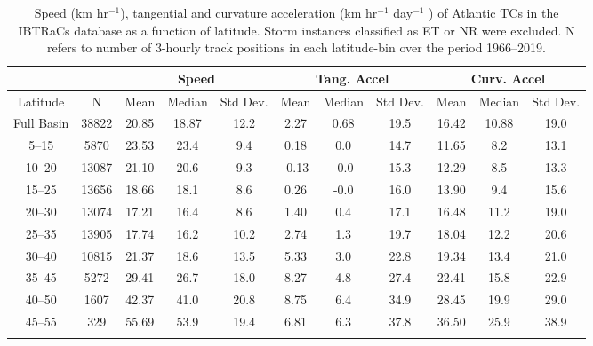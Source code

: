 \documentclass[wcd,manuscript]{copernicus}
\begin{document}
\begin{table*}[t]
  \caption{Speed (km hr$^{-1}$), tangential and curvature acceleration (km hr$^{-1}$ day$^{-1}$ ) of Atlantic TCs
   in the IBTRaCs database as a function of latitude. Storm instances classified as ET or NR were excluded.
   N refers to number of 3-hourly track positions in each latitude-bin over the period 1966--2019. }
\begin{tabular}{|cc|ccc|ccc|ccc|}
\hline
& & \multicolumn{3}{|c|}{Speed} & \multicolumn{3}{c|}{Tang. Accel} & \multicolumn{3}{c|}{Curv. Accel}\\
\hline
Latitude        & N     & Mean   & Median & Std Dev. & Mean & Median &  Std Dev.& Mean & Median & Std Dev.\\
Full Basin      & 38822 &  20.85 & 18.87 &  12.2 &   2.27 &  0.68 &  19.5 &  16.42 & 10.88 &  19.0 \\
	  5--15 &  5870 & 23.53 &  23.4 &   9.4 &  0.18 &   0.0 &  14.7 & 11.65 &   8.2 &  13.1 \\
	 10--20 & 13087 & 21.10 &  20.6 &   9.3 & -0.13 &  -0.0 &  15.3 & 12.29 &   8.5 &  13.3 \\
	 15--25 & 13656 & 18.66 &  18.1 &   8.6 &  0.26 &  -0.0 &  16.0 & 13.90 &   9.4 &  15.6 \\
	 20--30 & 13074 & 17.21 &  16.4 &   8.6 &  1.40 &   0.4 &  17.1 & 16.48 &  11.2 &  19.0 \\
	 25--35 & 13905 & 17.74 &  16.2 &  10.2 &  2.74 &   1.3 &  19.7 & 18.04 &  12.2 &  20.6 \\
	 30--40 & 10815 & 21.37 &  18.6 &  13.5 &  5.33 &   3.0 &  22.8 & 19.34 &  13.4 &  21.0 \\
	 35--45 &  5272 & 29.41 &  26.7 &  18.0 &  8.27 &   4.8 &  27.4 & 22.41 &  15.8 &  22.9 \\
	 40--50 &  1607 & 42.37 &  41.0 &  20.8 &  8.75 &   6.4 &  34.9 & 28.45 &  19.9 &  29.0 \\
	 45--55 &   329 & 55.69 &  53.9 &  19.4 &  6.81 &   6.3 &  37.8 & 36.50 &  25.9 &  38.9 \\
\bottomhline
\end{tabular}
\label{tab:distNA}
\end{table*}
\end{document}
